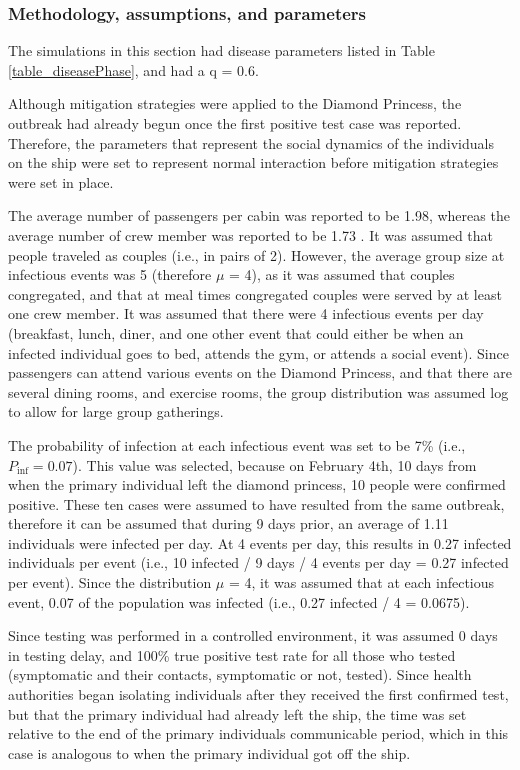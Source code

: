 \documentclass[sr]{drdc-report}
\def\Pinf{\ensuremath{P_\mathrm{inf}}}
\begin{document}
\subsubsection{Methodology, assumptions, and parameters}

The simulations in this section had disease parameters listed in Table \ref{table_diseasePhase}, and had a q = 0.6. 

Although mitigation strategies were applied to the Diamond Princess, the outbreak had already begun once the first positive test case was reported. Therefore, the parameters that represent the social dynamics of the individuals on the ship were set to represent normal interaction before mitigation strategies were set in place. 

The average number of passengers per cabin was reported to be 1.98, whereas the average number of crew member was reported to be 1.73 \cite{10..15585/mmwr..mm6912e3}. It was assumed that people traveled as couples (i.e., in pairs of 2). However, the average group size at infectious events was 5 (therefore $\mu$ = 4), as it was assumed that couples congregated, and that at meal times congregated couples were served by at least one crew member. It was assumed that there were 4 infectious events per day (breakfast, lunch, diner, and one other event that could either be when an infected individual goes to bed, attends the gym, or attends a social event). Since passengers can attend various events on the Diamond Princess, and that there are several dining rooms, and exercise rooms, the group distribution was assumed log to allow for large group gatherings. 

The probability of infection at each infectious event was set to be 7\% (i.e., $\Pinf = 0.07$). This value was selected, because on February 4th, 10 days from when the primary individual left the diamond princess, 10 people were confirmed positive. These ten cases were assumed to have resulted from the same outbreak, therefore it can be assumed that during 9 days prior, an average of 1.11 individuals were infected per day. At 4 events per day, this results in 0.27 infected individuals per event (i.e., 10 infected / 9 days / 4 events per day = 0.27 infected per event). Since the distribution $\mu$ = 4, it was assumed that at each infectious event, 0.07 of the population was infected (i.e., 0.27 infected / 4  = 0.0675).

Since testing was performed in a controlled environment, it was assumed 0 days in testing delay, and 100\% true positive test rate for all those who tested (symptomatic and their contacts, symptomatic or not, tested). Since health authorities began isolating individuals after they received the first confirmed test, but that the primary individual had already left the ship, the time was set relative to the end of the primary individuals communicable period, which in this case is analogous to when the primary individual got off the ship. 
\end{document}
